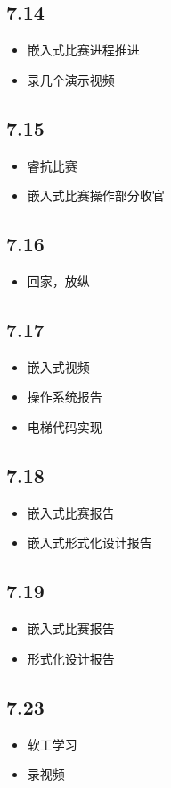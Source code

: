 \documentclass[UTF8]{ctexart}
\begin{document}
\subsection*{7.14}
\begin{itemize}
    \item 嵌入式比赛进程推进
    \item 录几个演示视频
\end{itemize}
\subsection*{7.15}
\begin{itemize}
    \item 睿抗比赛
    \item 嵌入式比赛操作部分收官
\end{itemize}
\subsection*{7.16}
\begin{itemize}
    \item 回家，放纵
\end{itemize}
\subsection*{7.17}
\begin{itemize}
    \item 嵌入式视频
    \item 操作系统报告
    \item 电梯代码实现
\end{itemize}
\subsection*{7.18}
\begin{itemize}
    \item 嵌入式比赛报告
    \item 嵌入式形式化设计报告
\end{itemize}
\subsection*{7.19}
\begin{itemize}
    \item 嵌入式比赛报告
    \item 形式化设计报告
\end{itemize}
\subsection*{7.23}
\begin{itemize}
    \item 软工学习
    \item 录视频
\end{itemize}
\end{document}
